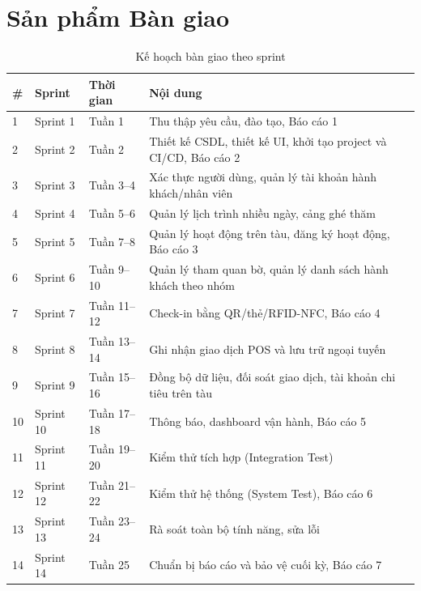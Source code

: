 \section{Sản phẩm Bàn giao}
\begin{table}[htbp]
    \centering
    \small
    \caption{Kế hoạch bàn giao theo sprint}
    \begin{tabular}{|p{0.6cm}|p{2cm}|p{2.5cm}|p{6.5cm}|}
        \hline
        \textbf{\#} & \textbf{Sprint} & \textbf{Thời gian} & \textbf{Nội dung} \\
        \hline
        1 & Sprint 1 & Tuần 1 & Thu thập yêu cầu, đào tạo, Báo cáo 1 \\
        \hline
        2 & Sprint 2 & Tuần 2 & Thiết kế CSDL, thiết kế UI, khởi tạo project và CI/CD, Báo cáo 2 \\
        \hline
        3 & Sprint 3 & Tuần 3--4 & Xác thực người dùng, quản lý tài khoản hành khách/nhân viên \\
        \hline
        4 & Sprint 4 & Tuần 5--6 & Quản lý lịch trình nhiều ngày, cảng ghé thăm \\
        \hline
        5 & Sprint 5 & Tuần 7--8 & Quản lý hoạt động trên tàu, đăng ký hoạt động, Báo cáo 3 \\
        \hline
        6 & Sprint 6 & Tuần 9--10 & Quản lý tham quan bờ, quản lý danh sách hành khách theo nhóm \\
        \hline
        7 & Sprint 7 & Tuần 11--12 & Check-in bằng QR/thẻ/RFID-NFC, Báo cáo 4 \\
        \hline
        8 & Sprint 8 & Tuần 13--14 & Ghi nhận giao dịch POS và lưu trữ ngoại tuyến \\
        \hline
        9 & Sprint 9 & Tuần 15--16 & Đồng bộ dữ liệu, đối soát giao dịch, tài khoản chi tiêu trên tàu \\
        \hline
        10 & Sprint 10 & Tuần 17--18 & Thông báo, dashboard vận hành, Báo cáo 5 \\
        \hline
        11 & Sprint 11 & Tuần 19--20 & Kiểm thử tích hợp (Integration Test) \\
        \hline
        12 & Sprint 12 & Tuần 21--22 & Kiểm thử hệ thống (System Test), Báo cáo 6 \\
        \hline
        13 & Sprint 13 & Tuần 23--24 & Rà soát toàn bộ tính năng, sửa lỗi \\
        \hline
        14 & Sprint 14 & Tuần 25 & Chuẩn bị báo cáo và bảo vệ cuối kỳ, Báo cáo 7 \\
        \hline
    \end{tabular}
\end{table}